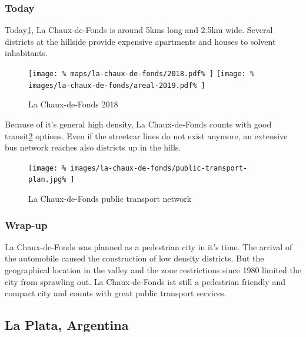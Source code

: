 \documentclass[twocolumn]{article}
\begin{document}
			
			\subsubsection{Today}
			
			Today\ref{fig:map:la-chaux-de-fonds-2018}, La Chaux-de-Fonds is around 5kms long and 2.5km wide. Several districts at the hillside provide expensive apartments and houses to solvent inhabitants.
			
			\begin{figure}[h!]
				\texttt{[image: \%
					maps/la-chaux-de-fonds/2018.pdf\%
				]}
				\texttt{[image: \%
					images/la-chaux-de-fonds/areal-2019.pdf\%
				]}
				\caption{La Chaux-de-Fonds 2018\cite{MapGeoAdmin:LaChauxDeFonds}}
				\label{fig:map:la-chaux-de-fonds-2018}
			\end{figure}
			
			Because of it's general high density, La Chaux-de-Fonds counts with good transit\ref{fig:la-chaux-de-fonds-public-transport} options. Even if the streetcar lines do not exist anymore, an extensive bus network reaches also districts up in the hills.
			
			
			
			\begin{figure}[h!]
				\texttt{[image: \%
					images/la-chaux-de-fonds/public-transport-plan.jpg\%
				]}
				\caption{La Chaux-de-Fonds public transport network\cite{TransN:LaChauxDeFonds}}
				\label{fig:la-chaux-de-fonds-public-transport}
			\end{figure}
			
			
			\subsubsection{Wrap-up}
			La Chaux-de-Fonds was planned as a pedestrian city in it's time.
			The arrival of the automobile caused the construction of low density districts.
			But the geographical location in the valley and the zone restrictions since 1980 limited the city from sprawling out.
			La Chaux-de-Fonds ist still a pedestrian friendly and compact city and counts with great public transport services.
			
			
		\clearpage
		\begin{strip}
		\subsection{La Plata, Argentina}
		\end{strip}
		
\end{document}
